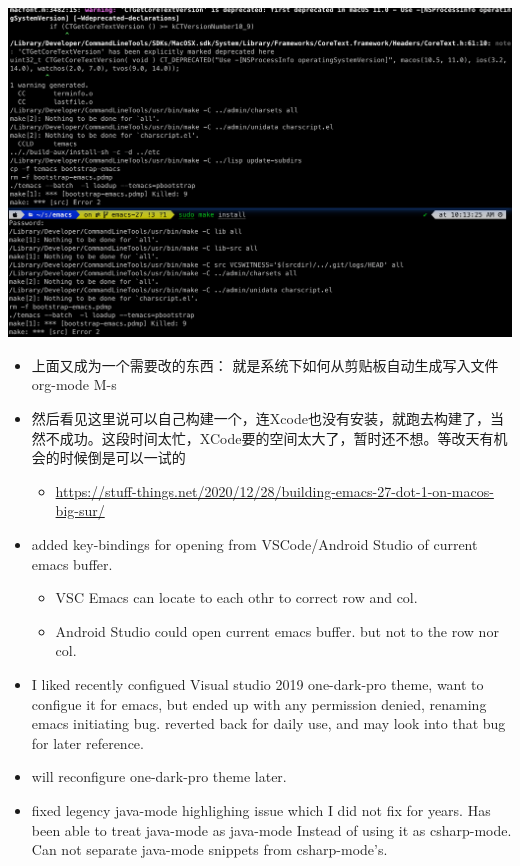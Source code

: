 \documentclass[9pt, b5paper]{article}
\begin{document}
\begin{center}
\includegraphics[width=.9\linewidth]{./pic/readme_20230208_102317.png}
\end{center}
\begin{itemize}
\item 上面又成为一个需要改的东西： 就是系统下如何从剪贴板自动生成写入文件 org-mode M-s
\item 然后看见这里说可以自己构建一个，连Xcode也没有安装，就跑去构建了，当然不成功。这段时间太忙，XCode要的空间太大了，暂时还不想。等改天有机会的时候倒是可以一试的
\begin{itemize}
\item \url{https://stuff-things.net/2020/12/28/building-emacs-27-dot-1-on-macos-big-sur/}
\end{itemize}
\item added key-bindings for opening from VSCode/Android Studio of current emacs buffer. 
\begin{itemize}
\item VSC Emacs can locate to each othr to correct row and col.
\item Android Studio could open current emacs buffer. but not to the row nor col.
\end{itemize}
\item I liked recently configued Visual studio 2019 one-dark-pro theme, want to configue it for emacs, but ended up with any permission denied, renaming emacs initiating bug. reverted back for daily use, and may look into that bug for later reference.
\item will reconfigure one-dark-pro theme later.
\item fixed legency java-mode highlighing issue which I did not fix for years. Has been able to treat java-mode as java-mode Instead of using it as csharp-mode. Can not separate java-mode snippets from csharp-mode's.
\end{itemize}
\end{document}
